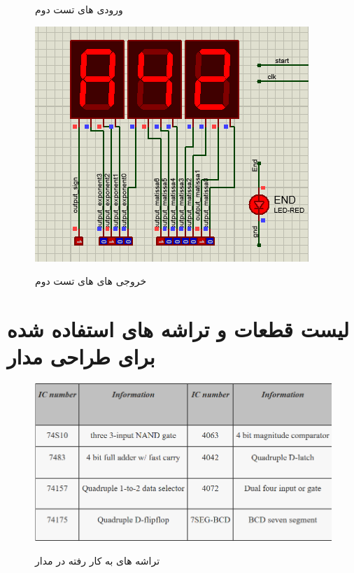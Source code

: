 \documentclass[twoside]{article}
\begin{document}
\begin{itemize}
\begin{figure}[h!]
\begin{center}
					\caption{ورودی های تست دوم}
				\end{center}
			\end{figure} 
			\begin{figure}[h!]
				\begin{center}
					\includegraphics[scale=0.8]{test2_outputs}‎
					\caption{خروجی های های تست دوم}
				\end{center}
			\end{figure} 
	\end{itemize}
	
	\newpage
	\section*{لیست قطعات و تراشه های استفاده شده برای طراحی مدار}
	\begin{figure}[h!]
		\begin{center}
			\includegraphics[scale=0.43]{ics}‎
			\caption{تراشه های به کار رفته در مدار}
		\end{center}
	\end{figure} 
	
\end{document}
